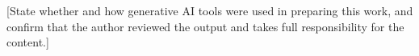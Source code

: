 
[State whether and how generative AI tools were used in preparing this work, and confirm that the author reviewed the output and takes full responsibility for the content.]
